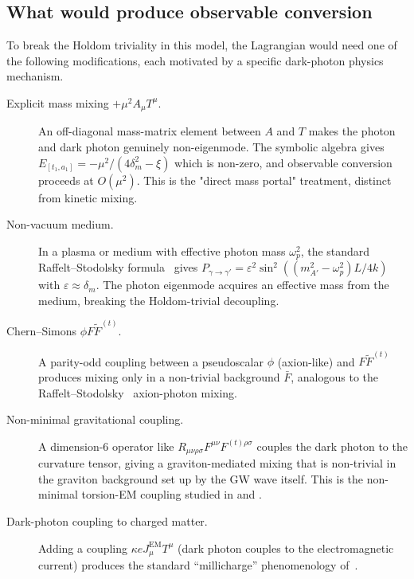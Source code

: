 \subsection{What would produce observable conversion}
\label{subsec:dp-what-works}

To break the Holdom triviality in this model, the Lagrangian
would need one of the following modifications, each motivated by a
specific dark-photon physics mechanism.

\begin{description}
  \item[Explicit mass mixing $+\mu^2 A_\mu T^\mu$.]
    An off-diagonal mass-matrix element between $A$ and $T$ makes
    the photon and dark photon genuinely non-eigenmode. The
    symbolic algebra gives
    $E_{[t_1, a_1]} = -\mu^2 / (4\delta_m^2 - \xi)$ which is
    non-zero, and observable conversion proceeds at $O(\mu^2)$.
    This is the "direct mass portal" treatment, distinct from
    kinetic mixing.
  \item[Non-vacuum medium.] In a plasma or medium with effective
    photon mass $\omega_p^2$, the standard Raffelt--Stodolsky
    formula~\cite{An2013StellarConstraints} gives
    $P_{\gamma\to\gamma'} = \varepsilon^2 \sin^2((m_{A'}^2 - \omega_p^2) L / 4k)$
    with $\varepsilon \approx \delta_m$. The photon eigenmode
    acquires an effective mass from the medium, breaking the
    Holdom-trivial decoupling.
  \item[Chern--Simons $\phi F \tilde{F}^{(t)}$.]
    A parity-odd coupling between a pseudoscalar $\phi$ (axion-like)
    and $F\tilde{F}^{(t)}$ produces mixing only in a non-trivial
    background $\bar{F}$, analogous to the
    Raffelt--Stodolsky~\cite{raffelt1988mixing} axion-photon
    mixing.
  \item[Non-minimal gravitational coupling.] A dimension-6 operator
    like $R_{\mu\nu\rho\sigma} F^{\mu\nu} F^{(t)\rho\sigma}$
    couples the dark photon to the curvature tensor, giving a
    graviton-mediated mixing that is non-trivial in the graviton
    background set up by the GW wave itself. This is the
    non-minimal torsion-EM coupling studied in
    \cite{itin2003maxwell} and \cite{rubilar2003torsion}.
  \item[Dark-photon coupling to charged matter.] Adding a coupling
    $\kappa e J_{\mu}^{\mathrm{EM}} T^\mu$ (dark photon couples to
    the electromagnetic current) produces the standard
    ``millicharge'' phenomenology of~\cite{Holdom1986}.
\end{description}

